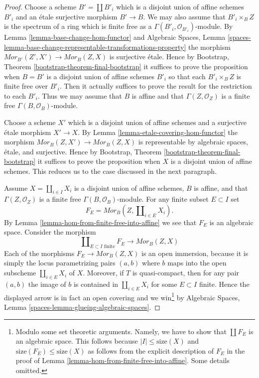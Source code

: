 \begin{proof}
Choose a scheme $B' = \coprod B'_i$ which is a disjoint union of
affine schemes $B'_i$ and an \'etale surjective morphism $B' \to B$. 
We may also assume that $B'_i \times_B Z$ is the spectrum of a ring
which is finite free as a $\Gamma(B'_i, \mathcal{O}_{B'_i})$-module.
By
Lemma \ref{lemma-base-change-hom-functor}
and
Algebraic Spaces, Lemma
\ref{spaces-lemma-base-change-representable-transformations-property}
the morphism $\mathit{Mor}_{B'}(Z', X') \to \mathit{Mor}_B(Z, X)$
is surjective \'etale. Hence by
Bootstrap, Theorem \ref{bootstrap-theorem-final-bootstrap}
it suffices to prove the proposition when $B = B'$ is a disjoint union of
affine schemes $B'_i$ so that each $B'_i \times_B Z$ is finite free
over $B'_i$. Then it actually suffices to prove the result for the restriction
to each $B'_i$. Thus we may assume that $B$ is affine and that
$\Gamma(Z, \mathcal{O}_Z)$ is a finite free $\Gamma(B, \mathcal{O}_B)$-module.

\medskip\noindent
Choose a scheme $X'$ which is a disjoint union of affine schemes and
a surjective \'etale morphism $X' \to X$. By
Lemma \ref{lemma-etale-covering-hom-functor}
the morphism $\mathit{Mor}_B(Z, X') \to \mathit{Mor}_B(Z, X)$
is representable by algebraic spaces, \'etale, and surjective.
Hence by
Bootstrap, Theorem \ref{bootstrap-theorem-final-bootstrap}
it suffices to prove the proposition when $X$ is a disjoint union
of affine schemes. This reduces us to the case discussed in the next
paragraph.

\medskip\noindent
Assume $X = \coprod_{i \in I} X_i$ is a disjoint union of affine
schemes, $B$ is affine, and that $\Gamma(Z, \mathcal{O}_Z)$ is a finite
free $\Gamma(B, \mathcal{O}_B)$-module. For any finite subset
$E \subset I$ set
$$
F_E = \mathit{Mor}_B(Z, \coprod\nolimits_{i \in E} X_i).
$$
By
Lemma \ref{lemma-hom-from-finite-free-into-affine}
we see that $F_E$ is an algebraic space. Consider the morphism
$$
\coprod\nolimits_{E \subset I\text{ finite}} F_E
\longrightarrow
\mathit{Mor}_B(Z, X)
$$
Each of the morphisms
$F_E \to \mathit{Mor}_B(Z, X)$ is an open immersion, because it is
simply the locus parametrizing pairs $(a, b)$ where $b$ maps into
the open subscheme $\coprod\nolimits_{i \in E} X_i$ of $X$. Moreover,
if $T$ is quasi-compact, then for any pair $(a, b)$ the image
of $b$ is contained in $\coprod\nolimits_{i \in E} X_i$ for some
$E \subset I$ finite. Hence the displayed arrow is in fact an
open covering and we win\footnote{Modulo
some set theoretic arguments. Namely, we have to show that
$\coprod F_E$ is an algebraic space. This follows because
$|I| \leq \text{size}(X)$ and $\text{size}(F_E) \leq \text{size}(X)$
as follows from the explicit description of $F_E$ in the proof of
Lemma \ref{lemma-hom-from-finite-free-into-affine}.
Some details omitted.} by
Algebraic Spaces, Lemma \ref{spaces-lemma-glueing-algebraic-spaces}.
\end{proof}











